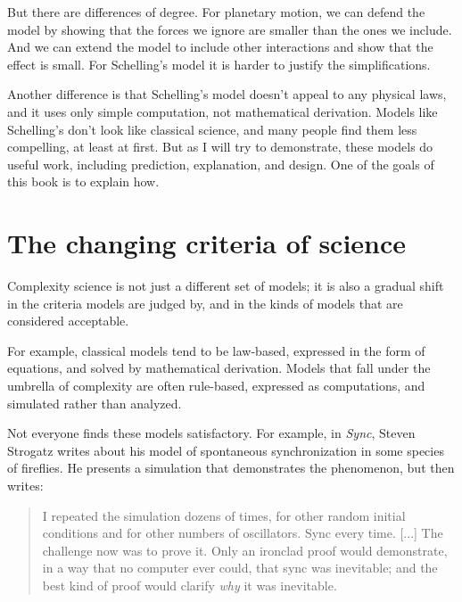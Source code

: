 \documentclass[12pt]{book}
\theoremstyle{exercise}
\begin{document}

But there are differences of degree.
For planetary motion, we can defend
the model by showing that the forces we ignore are smaller than the
ones we include.  And we can extend the model to include other
interactions and show that the effect is small.  For Schelling's model
it is harder to justify the simplifications.


Another difference is that Schelling's model doesn't appeal to any
physical laws, and it uses only simple computation, not mathematical
derivation.  Models like Schelling's don't look like classical
science, and many people find them less compelling, at least at first.
But as I will try to demonstrate, these models do useful work,
including prediction, explanation, and design.  One of the goals of
this book is to explain how.



\section{The changing criteria of science}

Complexity science is not just a different set of models; it is also a
gradual shift in the criteria models are judged by, and in the kinds
of models that are considered acceptable.


For example, classical models tend to be law-based, expressed in the
form of equations, and solved by mathematical derivation.  Models that
fall under the umbrella of complexity are often rule-based,
expressed as computations, and simulated rather than analyzed.

Not everyone finds these models satisfactory.  For example, in
{\em Sync}, Steven Strogatz writes about his model of spontaneous
synchronization in some species of fireflies.  He presents a
simulation that demonstrates the phenomenon, but then writes:


\begin{quote}
I repeated the simulation dozens of times, for other random
initial conditions and for other numbers of oscillators.  Sync
every time. [...] The challenge now was to prove it.  Only an
ironclad proof would demonstrate, in a way that no computer ever
could, that sync was inevitable; and the best kind of proof would
clarify {\em why} it was inevitable.
\end{quote}
\end{document}
